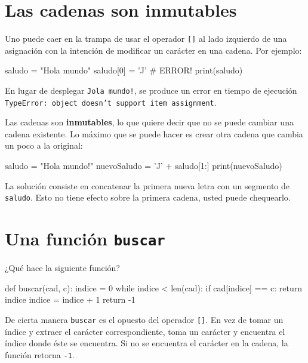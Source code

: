 \section{Las cadenas son inmutables}

  

Uno puede caer en la trampa de usar el operador \texttt{{[}{]}} al
lado izquierdo de una asignación con la intención de modificar un
carácter en una cadena. Por ejemplo:
\begin{pythoncode}
saludo = "Hola mundo"
saludo[0] = 'J'            # ERROR!
print(saludo)
\end{pythoncode}
 En lugar de desplegar \texttt{Jola mundo!}, se produce un error en
tiempo de ejecución \texttt{TypeError: object doesn't support item
assignment}.


Las cadenas son \textbf{inmutables}, lo que quiere decir que no se
puede cambiar una cadena existente. Lo máximo que se puede hacer es
crear otra cadena que cambia un poco a la original:
\begin{pythoncode}
saludo = "Hola mundo!"
nuevoSaludo = 'J' + saludo[1:]
print(nuevoSaludo)
\end{pythoncode}

La solución consiste en concatenar la primera nueva letra con un segmento
de \texttt{saludo}. Esto no tiene efecto sobre la primera cadena,
usted puede chequearlo.


\section{Una función \texttt{buscar} }

\label{find}   

¿Qué hace la siguiente función?

\begin{pythoncode}
def buscar(cad, c):
  indice = 0
  while indice < len(cad):
    if cad[indice] == c:
      return indice
    indice = indice + 1
  return -1
\end{pythoncode}
 De cierta manera \texttt{buscar} es el opuesto del operador \texttt{{[}{]}}.
En vez de tomar un índice y extraer el carácter correspondiente, toma
un carácter y encuentra el índice donde éste se encuentra. Si no se
encuentra el carácter en la cadena, la función retorna \texttt{-1}.


